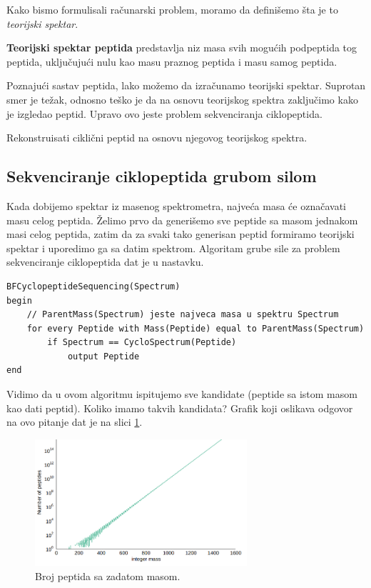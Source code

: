 Kako bismo formulisali računarski problem, moramo da definišemo šta je to \textit{teorijski spektar}. 
\begin{definicija} \textbf{Teorijski spektar peptida} predstavlja niz masa svih mogućih podpeptida tog peptida, uključujući nulu kao masu praznog peptida i masu samog peptida.
\end{definicija}

Poznajući sastav peptida, lako možemo da izračunamo teorijski spektar. Suprotan smer je težak, odnosno teško je da na osnovu teorijskog spektra zaključimo kako je izgledao peptid. Upravo ovo jeste problem sekvenciranja ciklopeptida.

\begin{problem} 
	Rekonstruisati ciklični peptid na osnovu njegovog teorijskog spektra. \\
\end{problem}



\subsection{Sekvenciranje ciklopeptida grubom silom}

Kada dobijemo spektar iz masenog spektrometra, najveća masa će označavati masu celog peptida. Želimo prvo da generišemo sve peptide sa masom jednakom masi celog peptida, zatim da za svaki tako generisan peptid formiramo teorijski spektar i uporedimo ga sa datim spektrom. Algoritam grube sile za problem sekvenciranje ciklopeptida dat je u nastavku. 

\begin{lstlisting}
BFCyclopeptideSequencing(Spectrum)
begin
	// ParentMass(Spectrum) jeste najveca masa u spektru Spectrum
	for every Peptide with Mass(Peptide) equal to ParentMass(Spectrum)
		if Spectrum == CycloSpectrum(Peptide)
			output Peptide
end
\end{lstlisting}

Vidimo da u ovom algoritmu ispitujemo sve kandidate (peptide sa istom masom kao dati peptid). Koliko imamo takvih kandidata? Grafik koji oslikava odgovor na ovo pitanje dat je na slici \ref{slika:kolikoPeptida}.

\begin{figure}[h!]
	\centering
	\includegraphics[width=0.7\textwidth]{poglavlja/4/slike/kolikoPeptida.png}
	\caption{Broj peptida sa zadatom masom.}
	\label{slika:kolikoPeptida}
\end{figure} 


